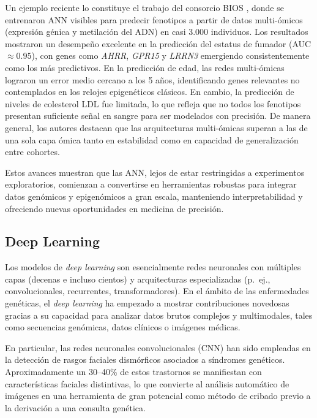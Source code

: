 \documentclass[11pt,a4paper,spanish]{book}
\numberwithin{equation}{chapter}
\numberwithin{figure}{chapter}
\begin{document}
Un ejemplo reciente lo constituye el trabajo del consorcio BIOS \cite{vanHilten2024}, donde se entrenaron ANN visibles para predecir fenotipos a partir de datos multi-ómicos (expresión génica y metilación del ADN) en casi 3.000 individuos. Los resultados mostraron un desempeño excelente en la predicción del estatus de fumador (AUC $\approx 0.95$), con genes como \textit{AHRR}, \textit{GPR15} y \textit{LRRN3} emergiendo consistentemente como los más predictivos. En la predicción de edad, las redes multi-ómicas lograron un error medio cercano a los 5 años, identificando genes relevantes no contemplados en los relojes epigenéticos clásicos. En cambio, la predicción de niveles de colesterol LDL fue limitada, lo que refleja que no todos los fenotipos presentan suficiente señal en sangre para ser modelados con precisión. De manera general, los autores destacan que las arquitecturas multi-ómicas superan a las de una sola capa ómica tanto en estabilidad como en capacidad de generalización entre cohortes.

Estos avances muestran que las ANN, lejos de estar restringidas a experimentos exploratorios, comienzan a convertirse en herramientas robustas para integrar datos genómicos y epigenómicos a gran escala, manteniendo interpretabilidad y ofreciendo nuevas oportunidades en medicina de precisión\cite{vanHilten2024,deep_angemuller_2016,Libbrecht2015}.

\subsection{Deep Learning}
Los modelos de \textit{deep learning} son esencialmente redes neuronales con múltiples capas (decenas e incluso cientos) y arquitecturas especializadas (p.~ej., convolucionales, recurrentes, transformadores). En el ámbito de las enfermedades genéticas, el \textit{deep learning} ha empezado a mostrar contribuciones novedosas gracias a su capacidad para analizar datos brutos complejos y multimodales, tales como secuencias genómicas, datos clínicos o imágenes médicas.  \cite{deep_angemuller_2016,Ching_2018}

En particular, las redes neuronales convolucionales (CNN) han sido empleadas en la detección de rasgos faciales dismórficos asociados a síndromes genéticos. Aproximadamente un 30--40\% de estos trastornos se manifiestan con características faciales distintivas, lo que convierte al análisis automático de imágenes en una herramienta de gran potencial como método de cribado previo a la derivación a una consulta genética\cite{gurovich2019,s21196595}.  
\end{document}

